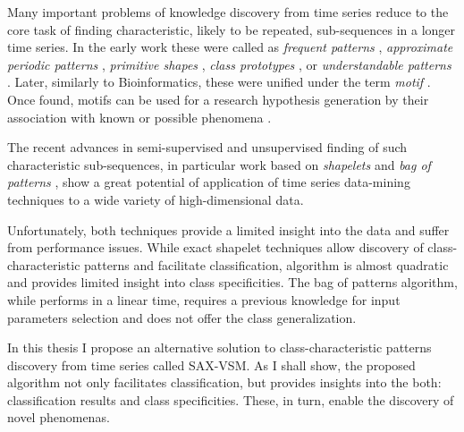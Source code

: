 Many important problems of knowledge discovery from time series reduce to the core task of finding 
characteristic, likely to be repeated, sub-sequences in a longer time series. 
In the early work these were called as 
\textit{frequent patterns} \cite{citeulike:5159615}, 
\textit{approximate periodic patterns} \cite{citeulike:1959582},
\textit{primitive shapes} \cite{citeulike:5898869}, 
\textit{class prototypes} \cite{citeulike:4406444}, 
or \textit{understandable patterns} \cite{citeulike:3978076}. 
Later, similarly to Bioinformatics, these were unified under the term \textit{motif} \cite{citeulike:3977965}.
Once found, motifs can be used for a research hypothesis generation by their association with known
or possible phenomena \cite{citeulike:3977965}. 

The recent advances in semi-supervised and unsupervised finding of such characteristic sub-sequences, 
in particular work based on \textit{shapelets} \cite{citeulike:7344347} \cite{citeulike:11957982}
\cite{citeulike:12552293} and \textit{bag of patterns} \cite{citeulike:10525778}, show a great potential 
of application of time series data-mining techniques to a wide variety of high-dimensional data.

Unfortunately, both techniques provide a limited insight into the data and suffer from performance issues. 
While exact shapelet techniques allow discovery of class-characteristic patterns and facilitate classification,
algorithm is almost quadratic and provides limited insight into class specificities. 
The bag of patterns algorithm, while performs in a linear time, requires a previous knowledge for input parameters 
selection and does not offer the class generalization.

In this thesis I propose an alternative solution to class-characteristic patterns discovery from time series called 
SAX-VSM. As I shall show, the proposed algorithm not only facilitates classification, but provides insights into 
the both: classification results and class specificities. These, in turn, enable the discovery of novel phenomenas.


%
%

